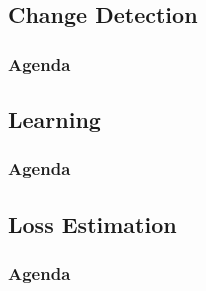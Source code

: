 \subsection{Change Detection}

\begin{frame}
\frametitle{Agenda}
\tableofcontents[currentsubsection]
\end{frame}



\subsection{Learning}

\begin{frame}
\frametitle{Agenda}
\tableofcontents[currentsubsection]
\end{frame}

\begin{frame}



\end{frame}







\subsection{Loss Estimation}

\begin{frame}
\frametitle{Agenda}
\tableofcontents[currentsubsection]
\end{frame}


